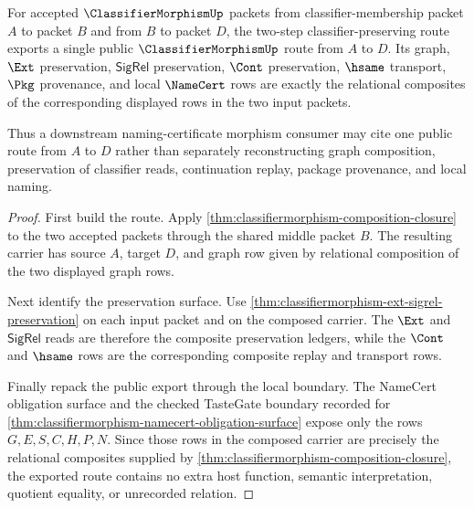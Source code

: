 \begin{theorem}
\label{thm:classifiermorphism-public-composition-export}
For accepted $\ClassifierMorphismUp$ packets from classifier-membership packet $A$ to packet $B$ and from $B$ to packet $D$, the two-step classifier-preserving route exports a single public $\ClassifierMorphismUp$ route from $A$ to $D$. Its graph, $\Ext$ preservation, $\mathsf{SigRel}$ preservation, $\Cont$ preservation, $\hsame$ transport, $\Pkg$ provenance, and local $\NameCert$ rows are exactly the relational composites of the corresponding displayed rows in the two input packets.

Thus a downstream naming-certificate morphism consumer may cite one public route from $A$ to $D$ rather than separately reconstructing graph composition, preservation of classifier reads, continuation replay, package provenance, and local naming.
\end{theorem}
\begin{proof}
First build the route. Apply \autoref{thm:classifiermorphism-composition-closure} to the two accepted packets through the shared middle packet $B$. The resulting carrier has source $A$, target $D$, and graph row given by relational composition of the two displayed graph rows.

Next identify the preservation surface. Use \autoref{thm:classifiermorphism-ext-sigrel-preservation} on each input packet and on the composed carrier. The $\Ext$ and $\mathsf{SigRel}$ reads are therefore the composite preservation ledgers, while the $\Cont$ and $\hsame$ rows are the corresponding composite replay and transport rows.

Finally repack the public export through the local boundary. The NameCert obligation surface and the checked TasteGate boundary recorded for \autoref{thm:classifiermorphism-namecert-obligation-surface} expose only the rows $G,E,S,C,H,P,N$. Since those rows in the composed carrier are precisely the relational composites supplied by \autoref{thm:classifiermorphism-composition-closure}, the exported route contains no extra host function, semantic interpretation, quotient equality, or unrecorded relation.
\end{proof}

